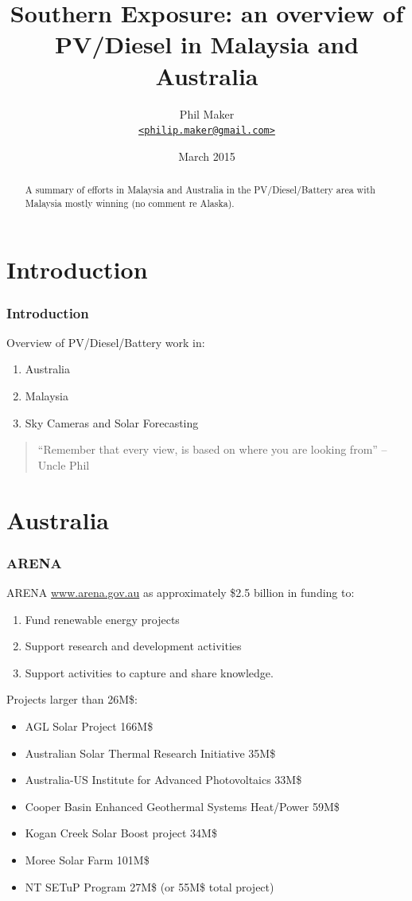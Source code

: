 \documentclass[a4paper,handout]{beamer}
\title{Southern Exposure: an overview of PV/Diesel in Malaysia and
  Australia}
\author{Phil Maker\\
  \href{mailto:philip.maker@gmail.com}{\texttt{<philip.maker@gmail.com>}}
}
\institute{Alaskan Center for Energy and Power}
\date{March 2015}
\begin{document}
\begin{frame}
  \maketitle
  \vspace{-0.6cm}
  \begin{abstract}
    \small A summary of efforts in Malaysia and Australia in the
    PV/Diesel/Battery area with Malaysia mostly winning (no comment re Alaska).
  \end{abstract}
\end{frame}

\section{Introduction}
\begin{frame}\frametitle{Introduction}
Overview of PV/Diesel/Battery work in:
 
  \begin{enumerate}
  \item Australia
  \item Malaysia
  \item Sky Cameras and Solar Forecasting
  \end{enumerate}

\pause
\vfill
\begin{quote}
``Remember that every view,
\pause
is based on where you are looking from'' -- Uncle Phil
\end{quote}

\end{frame}

\section{Australia}
\begin{frame}\frametitle{ARENA}
  ARENA \href{www.arena.gov.au}{www.arena.gov.au} as approximately \$2.5 billion in funding to:
  \begin{enumerate}
  \item Fund renewable energy projects
  \item Support research and development activities
  \item Support activities to capture and share knowledge.
  \end{enumerate}
\pause
Projects larger than 26M\$:
\begin{itemize}
\item AGL Solar Project 166M\$
\item Australian Solar Thermal Research Initiative 35M\$
\item Australia-US Institute for Advanced Photovoltaics 33M\$
\item Cooper Basin Enhanced Geothermal Systems Heat/Power 59M\$
\item Kogan Creek Solar Boost project 34M\$
\item Moree Solar Farm 101M\$
\item NT SETuP Program 27M\$ (or 55M\$ total project)
\end{itemize}
\end{frame}
\end{document}
